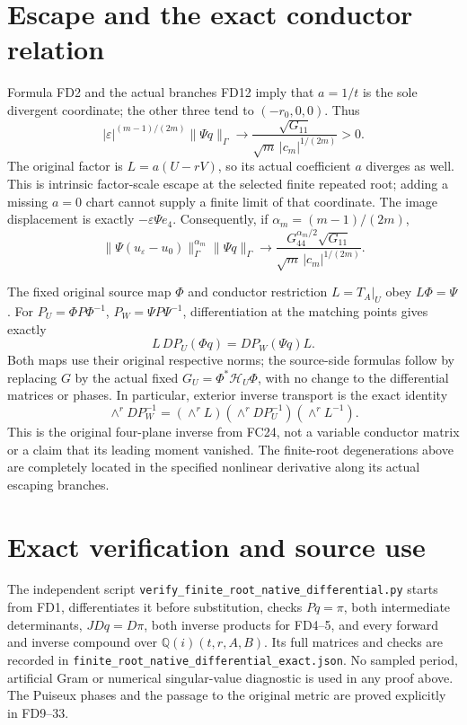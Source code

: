 \section{Escape and the exact conductor relation}
Formula FD2 and the actual branches FD12 imply that
\(a=1/t\) is the sole divergent coordinate; the other
three tend to \((-r_0,0,0)\). Thus
\[
 |\varepsilon|^{(m-1)/(2m)}\|\Psi q\|_\Gamma
 \longrightarrow\frac{\sqrt{G_{11}}}
                         {\sqrt m\,|c_m|^{1/(2m)}}>0.
 \tag{FD32}
\]
The original factor is \(L=a(U-rV)\), so its actual
coefficient \(a\) diverges as well. This is intrinsic
factor-scale escape at the selected finite repeated root;
adding a missing \(a=0\) chart cannot supply a finite
limit of that coordinate. The image displacement is
exactly \(-\varepsilon\Psi e_4\). Consequently, if
\(\alpha_m=(m-1)/(2m)\),
\[
 \|\Psi(u_\varepsilon-u_0)\|_\Gamma^{\alpha_m}
 \|\Psi q\|_\Gamma
 \longrightarrow
 \frac{G_{44}^{\alpha_m/2}\sqrt{G_{11}}}
                         {\sqrt m\,|c_m|^{1/(2m)}}.
 \tag{FD33}
\]

The fixed original source map \(\Phi\) and conductor
restriction \(L=T_A|_U\) obey \(L\Phi=\Psi\).
For \(P_U=\Phi P\Phi^{-1}\), \(P_W=\Psi P\Psi^{-1}\),
differentiation at the matching points gives exactly
\[
 L\,DP_U(\Phi q)=DP_W(\Psi q)L.
 \tag{FD34}
\]
Both maps use their original respective norms; the
source-side formulas follow by replacing \(G\) by
the actual fixed \(G_U=\Phi^*\mathcal H_U\Phi\), with
no change to the differential matrices or phases.
In particular, exterior inverse transport is the exact
identity
\[
 \wedge^r DP_W^{-1}
   =(\wedge^rL)(\wedge^rDP_U^{-1})(\wedge^rL^{-1}).
 \tag{FD35}
\]
This is the original four-plane inverse from FC24, not
a variable conductor matrix or a claim that its leading
moment vanished. The finite-root degenerations above
are completely located in the specified nonlinear
derivative along its actual escaping branches.

\section{Exact verification and source use}
The independent script
\texttt{verify\_finite\_root\_native\_differential.py}
starts from FD1, differentiates it before substitution,
checks \(Pq=\pi\), both intermediate determinants,
\(JDq=D\pi\), both inverse products for FD4--5,
and every forward and inverse compound over
\(\mathbb Q(i)(t,r,A,B)\). Its full matrices and checks
are recorded in
\texttt{finite\_root\_native\_differential\_exact.json}.
No sampled period, artificial Gram or numerical
singular-value diagnostic is used in any proof above.
The Puiseux phases and the passage to the original metric
are proved explicitly in FD9--33.
